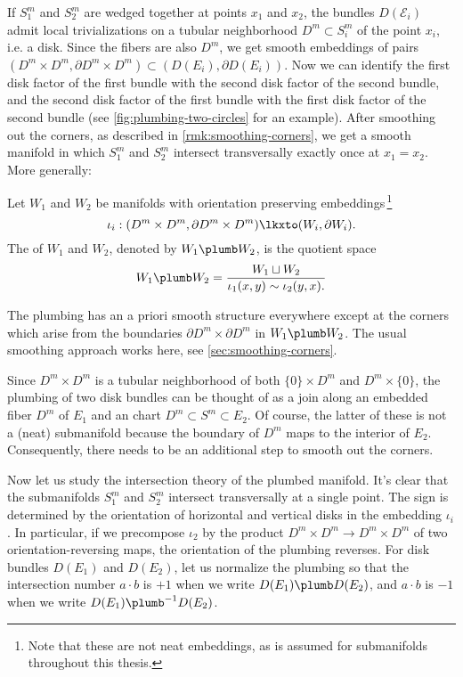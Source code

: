 If $S^m_1$ and $S^m_2$ are wedged together at points $x_1$ and $x_2$,
the bundles $D(\mathcal{E}_i)$ admit local trivializations on a tubular neighborhood $D^m \subset S^m_i$ of the point $x_i$, i.e. a disk.
Since the fibers are also $D^m$, we get smooth embeddings of pairs $(D^m\times D^m, \partial D^m\times D^m)\subset (D(E_i),\partial D(E_i))$.
Now we can identify the first disk factor of the first bundle with the second disk factor of the second bundle, and the second disk factor of the first bundle with the first disk factor of the second bundle (see \cref{fig:plumbing-two-circles} for an example). After smoothing out the corners, as described in \cref{rmk:smoothing-corners}, we get a smooth manifold in which $S_1^m$ and $S_2^m$ intersect transversally exactly once at $x_1=x_2$. More generally:

\begin{definition}\label{def:plumbing}
	Let $W_1$ and $W_2$ be manifolds with orientation preserving embeddings\,\footnote{Note that these are not neat embeddings, as is assumed for submanifolds throughout this thesis.}
	\[\iota_i : (D^m\times D^m, \partial D^m\times D^m)\lkxto (W_i, \partial W_i).\]
	The  of $W_1$ and $W_2$, denoted by $W_1\plumb W_2$, is the quotient space
	\[
		W_1\plumb W_2 = \frac{W_1\sqcup W_2}{\iota_1(x,y)\sim \iota_2(y,x).}
	\]
\end{definition}

\begin{remark}\label{rmk:smoothing-corners}
	The plumbing has an a priori smooth structure everywhere except at the corners which arise from the boundaries $\partial D^m\times \partial D^m$ in $W_1\plumb W_2$. The usual smoothing approach works here, see \cref{sec:smoothing-corners}.
\end{remark}

\begin{remark}
	Since $D^m\times D^m$ is a tubular neighborhood of both $\{0\}\times D^m$ and $D^m\times\{0\}$, the plumbing of two disk bundles can be thought of as a join along an embedded fiber $D^m$ of $E_1$ and an chart $D^m\subset S^m\subset E_2$. Of course, the latter of these is not a (neat) submanifold because the boundary of $D^m$ maps to the interior of $E_2$. Consequently, there needs to be an additional step to smooth out the corners.
\end{remark}

Now let us study the intersection theory of the plumbed manifold. It's clear that the submanifolds $S_1^m$ and $S_2^m$ intersect transversally at a single point. The sign is determined by the orientation of horizontal and vertical disks in the embedding $\iota_i$. In particular, if we precompose $\iota_2$ by the product $D^m\times D^m\to D^m\times D^m$ of two orientation-reversing maps, the orientation of the plumbing reverses. For disk bundles $D(E_1)$ and $D(E_2)$, let us normalize the plumbing so that the intersection number $a\cdot b$ is $+1$ when we write $D(E_1)\plumb D(E_2)$, and $a\cdot b$ is $-1$ when we write $D(E_1)\plumb^{-1} D(E_2)$.

